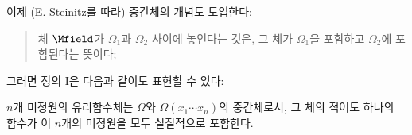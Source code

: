 
이제 (E. Steinitz를 따라) 중간체의 개념도 도입한다:
\begin{quote}
\glqq{}체 $\Mfield$가 $\Omega_1$과 $\Omega_2$ 사이에 놓인다는 것은, 그 체가 $\Omega_1$을 포함하고 $\Omega_2$에 포함된다는 뜻이다\grqq{};
\end{quote}
그러면 정의 I은 다음과 같이도 표현할 수 있다:

$n$개 미정원의 유리함수체는 $\Omega$와 $\Omega(x_1\cdots x_n)$의 중간체로서, 그 체의 적어도 하나의 함수가 이 $n$개의 미정원을 모두 실질적으로 포함한다.
